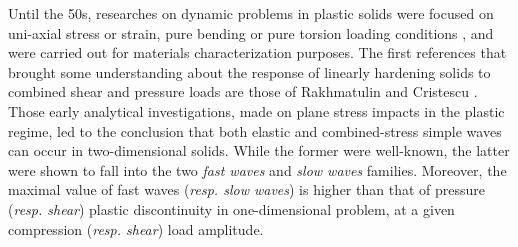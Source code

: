 



Until the 50s, researches on dynamic problems in plastic solids were focused on uni-axial stress or strain, pure bending or pure torsion loading conditions \cite{Taylor,vonKarman}, and were carried out for materials characterization purposes.
The first references that brought some understanding about the response of linearly hardening solids to combined shear and pressure loads are those of Rakhmatulin \cite{Rakhmatulin} and Cristescu \cite{CRISTESCU19591605}.
Those early analytical investigations, made on plane stress impacts in the plastic regime, led to the conclusion that both elastic and combined-stress simple waves can occur in two-dimensional solids. 
While the former were well-known, the latter were shown to fall into the two \textit{fast waves} and \textit{slow waves} families.
Moreover, the maximal value of fast waves (\textit{resp. slow waves}) is higher than that of pressure (\textit{resp. shear}) plastic discontinuity in one-dimensional problem, at a given compression (\textit{resp. shear}) load amplitude.

